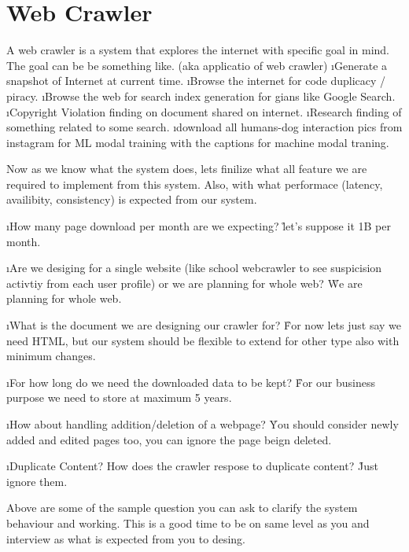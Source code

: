 
\chapter{Web Crawler}

    A web crawler is a system that explores the internet with specific goal in mind. The goal can be be something like. (aka applicatio of web crawler)
    \ls
        \i Generate a snapshot of Internet at current time.
        \i Browse the internet for code duplicacy / piracy.
        \i Browse the web for search index generation for gians like Google Search.
        \i  Copyright Violation finding on document shared on internet.
        \i Research finding of something related to some search.
        \i download  all humans-dog interaction pics from instagram for ML modal training with the captions for machine modal traning.
    \le
\qe



Now as we know what the system does, lets finilize what all feature we are required to implement from this system. Also, with what performace (latency, availibity, consistency) is expected from our system.

\lstart
    \i How many page download per month are we expecting? 
    \r{let's suppose it 1B per month.}
    
    \i Are we desiging for a single website (like school webcrawler to see suspicision activtiy from each user profile) or we are planning for whole web?
    \r{We are planning for whole web.}

    \i What is the document we are designing our crawler for?
    \r{For now lets just say we need HTML, but our system should be flexible to extend for other type also with minimum changes.}

    \i For how long do we need the downloaded data to be kept?
    \r{For our business purpose we need to store at maximum 5 years.}

    \i How about handling addition/deletion of a webpage?
    \r{You should consider newly added and edited pages too, you can ignore the page beign deleted.}

    \i Duplicate Content? How does the crawler respose to duplicate content?
    \r{Just ignore them.}

    Above are some of the sample question you can ask to clarify the system behaviour and working. This is a good time to be on same level as you and interview as what is expected from you to desing.
\lend

